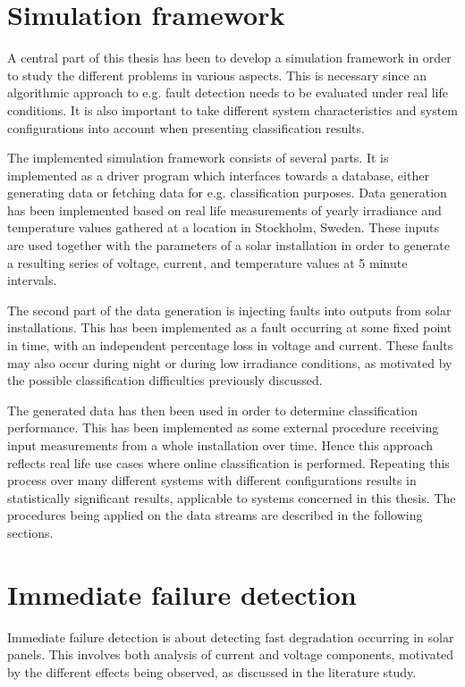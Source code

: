 \section{Simulation framework}
A central part of this thesis has been to develop a simulation framework in order to study the different problems in various aspects.
This is necessary since an algorithmic approach to e.g. fault detection needs to be evaluated under real life conditions.
It is also important to take different system characteristics and system configurations into account when presenting classification results.

The implemented simulation framework consists of several parts.
It is implemented as a driver program which interfaces towards a database, either generating data or fetching data for e.g. classification purposes.
Data generation has been implemented based on real life measurements of yearly irradiance and temperature values gathered at a location in Stockholm, Sweden.
These inputs are used together with the parameters of a solar installation in order to generate a resulting series of voltage, current, and temperature values at 5 minute intervals.

The second part of the data generation is injecting faults into outputs from solar installations.
This has been implemented as a fault occurring at some fixed point in time, with an independent percentage loss in voltage and current.
These faults may also occur during night or during low irradiance conditions, as motivated by the possible classification difficulties previously discussed.

The generated data has then been used in order to determine classification performance.
This has been implemented as some external procedure receiving input measurements from a whole installation over time.
Hence this approach reflects real life use cases where online classification is performed.
Repeating this process over many different systems with different configurations results in statistically significant results, applicable to systems concerned in this thesis.
The procedures being applied on the data streams are described in the following sections.

\section{Immediate failure detection}
Immediate failure detection is about detecting fast degradation occurring in solar panels.
This involves both analysis of current and voltage components, motivated by the different effects being observed, as discussed in the literature study.

